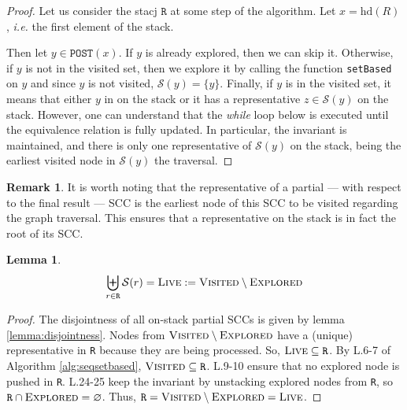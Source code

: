 \documentclass[a4 paper, 12pt]{article}
\theoremstyle{definition}
\newtheorem{lemma}{Lemma}
\newtheorem{remark}{Remark}
\begin{document}
\begin{proof}
    Let us consider the stacj $\texttt{R}$ at some step of the algorithm. Let $x = \text{hd}(R)$, \textit{i.e.} the first element of the stack.
    \BlankLine
    
    Then let $y \in \texttt{POST}(x)$. If $y$ is already explored, then we can skip it.
    \BlankLine
    Otherwise, if $y$ is not in the visited set, then we explore it by calling the function \texttt{setBased} on $y$ and since $y$ is not visited, $\mathcal{S}(y) = \{y\}$.
    \BlankLine
    Finally, if $y$ is in the visited set, it means that either $y$ in on the stack or it has a representative $z \in \mathcal{S}(y)$ on the stack. However, one can understand that the \textit{while} loop below is executed until the equivalence relation is fully updated. In particular, the invariant is maintained, and there is only one representative of $\mathcal{S}(y)$ on the stack, being the earliest visited node in $\mathcal{S}(y)$ the traversal.

\end{proof}

\begin{remark}\label{rem:rootSCC}
    It is worth noting that the representative of a partial — with respect to the final result — SCC is the earliest node of this SCC to be visited regarding the graph traversal. This ensures that a representative on the stack is in fact the root of its SCC.
\end{remark}

\begin{lemma}
    \begin{equation*}
        \biguplus_{r \in \texttt{R}} \mathcal{S}(r) = \textsc{Live} := \textsc{Visited} \setminus \textsc{Explored}
    \end{equation*}
\end{lemma}

\begin{proof}
    The disjointness of all on-stack partial SCCs is given by lemma \ref{lemma:disjointness}. Nodes from $\textsc{Visited} \setminus \textsc{Explored}$ have a (unique) representative in \texttt{R} because they are being processed. So, $\textsc{Live} \subseteq \texttt{R}$.
    \BlankLine
    By L.6-7 of Algorithm \ref{alg:seqsetbased}, $\textsc{Visited} \subseteq \texttt{R}$.
    L.9-10 ensure that no explored node is pushed in \texttt{R}.
    L.24-25 keep the invariant by unstacking explored nodes from \texttt{R}, so $\texttt{R} \cap \textsc{Explored} = \varnothing$. Thus, $\texttt{R} = \textsc{Visited} \setminus \textsc{Explored} = \textsc{Live}$.
\end{proof}
\end{document}
